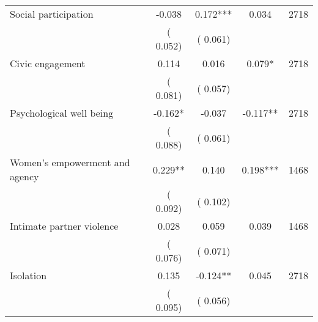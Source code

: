 \begin{tabular}{l*{4}{c}}
 Social participation &             -0.038 &         0.172*** &           0.034 & 2718                       \\  
                 &        (       0.052)                   &        (       0.061)                        &                                                             &                                                      \\      

 Civic engagement &              0.114 &         0.016 &           0.079* & 2718                       \\  
                 &        (       0.081)                   &        (       0.057)                        &                                                             &                                                      \\      

 Psychological well being &             -0.162* &        -0.037 &          -0.117** & 2718                       \\  
                 &        (       0.088)                   &        (       0.061)                        &                                                             &                                                      \\      

 Women's empowerment and agency &              0.229** &         0.140 &           0.198*** & 1468                       \\  
                 &        (       0.092)                   &        (       0.102)                        &                                                             &                                                      \\      

 Intimate partner violence &              0.028 &         0.059 &           0.039 & 1468                       \\  
                 &        (       0.076)                   &        (       0.071)                        &                                                             &                                                      \\      

 Isolation &              0.135 &        -0.124** &           0.045 & 2718                       \\  
                 &        (       0.095)                   &        (       0.056)                        &                                                             &                                                      \\      


\end{tabular}
